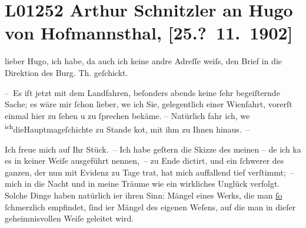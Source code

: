 

\section[Arthur Schnitzler an Hugo von Hofmannsthal, {[}25.? 11. 1902{]}]{L01252 Arthur Schnitzler an Hugo von Hofmannsthal, {[}25.? 11. 1902{]}}
\nopagebreak{}
\rehead{ }\normalsize\beginnumbering{}
\toendnotes[C]{\smallbreak\pagebreak[2]}
\toendnotes[C]{\smallbreak}
\pstart
           \noindent{}{\pb}lieber Hugo, ich habe, da auch ich keine andre Adreſſe weiſs, den
               Brief in die Direktion des Burg. Th.
               geſchickt.\pend
           
\pstart
           – Es iſt jetzt mit dem Landfahren, beſonders abends  keine ſehr begeiſternde Sache; es wäre mir ſchon lieber, we{\geminationn} ich Sie, gelegentlich einer Wienfahrt, vorerſt einmal hier zu ſehen u zu ſprechen bekäme. –
               Natürlich fahr ich, we{\geminationn}{ }\substVorne{}\textsuperscript{ich}\substDazwischen{}die\substHinten{}{ }Hauptma{\geminationn}geſchichte zu Stande ko{\geminationm}t, mit ihm zu Ihnen {\pb}hinaus. –\pend
           
\pstart
           Ich freue mich auf Ihr Stück. – Ich habe geſtern die Skizze des meinen – de{\geminationn} ich ka{\geminationn} es in keiner Weiſe ausgeführt nennen, – zu Ende
               dictirt, und ein ſchwerer \label{K_L01252-1v}\label{K_L01252-1} des ganzen, der nun mit Evidenz zu Tage trat, hat mich auffallend tief
               verſtimmt; – mich in die Nacht und in meine Träume wie ein wirkliches Unglück ver{\pb}folgt. Solche Dinge haben natürlich i{\geminationm}er ihren Sinn: Mängel eines Werks, die man \uline{ſo}{ }ſchmerzlich empfindet, ſind i{\geminationm}er Mängel des eigenen Weſens, auf die man in dieſer
               geheimnisvollen Weiſe geleitet wird.\pend
           
